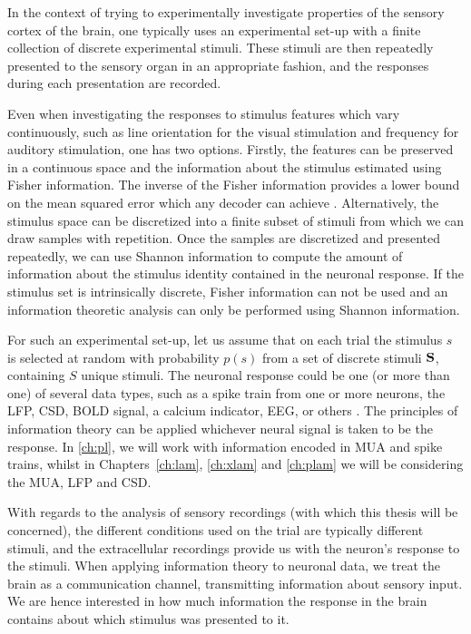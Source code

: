 In the context of trying to experimentally investigate properties of the sensory cortex of the brain, one typically uses an experimental set-up with a finite collection of discrete experimental stimuli.
These stimuli are then repeatedly presented to the sensory organ in an appropriate fashion, and the responses during each presentation are recorded.

Even when investigating the responses to stimulus features which vary continuously, such as line orientation for the visual stimulation and frequency for auditory stimulation, one has two options.
Firstly, the features can be preserved in a continuous space and the information about the stimulus estimated using Fisher information. The inverse of the Fisher information provides a lower bound on the mean squared error which any decoder can achieve \citep{Quiroga2009}.
Alternatively, the stimulus space can be discretized into a finite subset of stimuli from which we can draw samples with repetition.
Once the samples are discretized and presented repeatedly, we can use Shannon information to compute the amount of information about the stimulus identity contained in the neuronal response.
If the stimulus set is intrinsically discrete, Fisher information can not be used and an information theoretic analysis can only be performed using Shannon information.

For such an experimental set-up, let us assume that on each trial the stimulus $s$ is selected at random with probability $p(s)$ from a set of discrete stimuli $\mathbf{S}$, containing $S$ unique stimuli.
The neuronal response could be one (or more than one) of several data types, such as a spike train from one or more neurons, the \ac{LFP}, \ac{CSD}, \ac{BOLD} signal, a calcium indicator, \ac{EEG}, or others \citep{Magri2009,Quiroga2009}.
The principles of information theory can be applied whichever neural signal is taken to be the response.
In \autoref{ch:pl}, we will work with information encoded in \ac{MUA} and spike trains, whilst in Chapters~\ref{ch:lam}, \ref{ch:xlam} and \ref{ch:plam} we will be considering the \ac{MUA}, \ac{LFP} and \ac{CSD}.

With regards to the analysis of sensory recordings (with which this thesis will be concerned), the different conditions used on the trial are typically different stimuli, and the extracellular recordings provide us with the neuron's response to the stimuli.
When applying information theory to neuronal data, we treat the brain as a communication channel, transmitting information about sensory input.
We are hence interested in how much information the response in the brain contains about which stimulus was presented to it.

